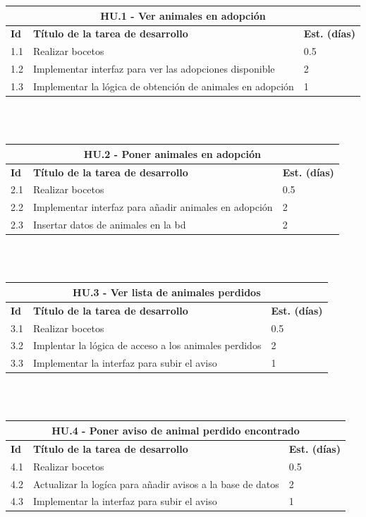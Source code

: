 \begin{tabular}{|l|p{9.5cm}|p{1cm}|}
	\hline
	\multicolumn{3}{|c|}{\textbf{HU.1 - Ver animales en adopción}} \\
	\hline
	\textbf{Id} & \textbf{Título de la tarea de desarrollo} & \textbf{Est. (días)} \\
	\hline
	1.1 & Realizar bocetos & 0.5 \\ \hline
	1.2 &  Implementar interfaz para ver las adopciones disponible & 2 \\ \hline
	1.3 &  Implementar la lógica de obtención de animales en adopción & 1 \\ \hline
\end{tabular} \\ \\

\begin{tabular}{|l|p{9.5cm}|p{1cm}|}
	\hline
	\multicolumn{3}{|c|}{\textbf{HU.2 - Poner animales en adopción}} \\
	\hline
	\textbf{Id} & \textbf{Título de la tarea de desarrollo} & \textbf{Est. (días)} \\ %
	\hline
	2.1 & Realizar bocetos & 0.5 \\ \hline
	2.2 &  Implementar interfaz para añadir animales en adopción & 2 \\ \hline
	2.3 &  Insertar datos de animales en la bd & 2 \\ \hline 
\end{tabular} \\ \\

\begin{tabular}{|l|p{9.5cm}|p{1cm}|}
	\hline
	\multicolumn{3}{|c|}{\textbf{HU.3 - Ver lista de animales perdidos}} \\
	\hline
	\textbf{Id} & \textbf{Título de la tarea de desarrollo} & \textbf{Est. (días)} \\
	\hline
	3.1 & Realizar bocetos & 0.5 \\ \hline
	3.2 &  Implentar la lógica de acceso a los animales perdidos & 2 \\ \hline
	3.3 &  Implementar la interfaz para subir el aviso & 1 \\ \hline
\end{tabular} \\ \\


\begin{tabular}{|l|p{9.5cm}|p{1cm}|}
	\hline
	\multicolumn{3}{|c|}{\textbf{HU.4 - Poner aviso de animal perdido encontrado}} \\
	\hline
	\textbf{Id} & \textbf{Título de la tarea de desarrollo} & \textbf{Est. (días)} \\
	\hline
	4.1 & Realizar bocetos & 0.5 \\ \hline
	4.2 &  Actualizar la logíca para añadir avisos a la base de datos & 2 \\ \hline
	4.3 &  Implementar la interfaz para subir el aviso & 1 \\ \hline
\end{tabular} \\ \\


